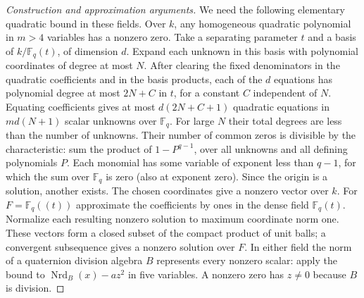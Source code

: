 \documentclass[11pt,a4paper,openany,oneside]{book}
\theoremstyle{resultstyle}
\theoremstyle{definition}
\numberwithin{equation}{chapter}
\begin{document}
\begin{proof}[Construction and approximation arguments]
We need the following elementary quadratic bound in these fields.
Over \(k\), any homogeneous quadratic polynomial in \(m>4\)
variables has a nonzero zero. Take a separating parameter
\(t\) and a basis of \(k/\mathbb F_q(t)\), of dimension \(d\).
Expand each unknown in this basis with polynomial coordinates
of degree at most \(N\). After clearing the fixed denominators
in the quadratic coefficients and in the basis products, each of
the \(d\) equations has polynomial degree at most \(2N+C\) in
\(t\), for a constant \(C\) independent of \(N\). Equating
coefficients gives at most \(d(2N+C+1)\) quadratic equations
in \(md(N+1)\) scalar unknowns over \(\mathbb F_q\).
For large \(N\) their total degrees are less than the number
of unknowns. Their number of common zeros is divisible by the
characteristic: sum the product of \(1-P^{q-1}\), over all
unknowns and all defining polynomials \(P\). Each monomial
has some variable of exponent less than \(q-1\), for which
the sum over \(\mathbb F_q\) is zero (also at exponent zero).
Since the origin is a solution, another exists. The chosen
coordinates give a nonzero vector over \(k\).
For \(F=\mathbb F_q((t))\) approximate the coefficients by
ones in the dense field \(\mathbb F_q(t)\). Normalize
each resulting nonzero solution to maximum coordinate norm one.
These vectors form a closed subset of the compact product of
unit balls; a convergent subsequence gives a nonzero solution
over \(F\). In either field the norm of a quaternion division
algebra \(B\) represents every nonzero scalar: apply the bound to
\(\operatorname{Nrd}_B(x)-a z^2\) in five variables. A nonzero
zero has \(z\ne0\) because \(B\) is division.


\end{proof}
\end{document}
